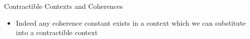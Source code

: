 \documentclass[12pt, mathserif,handout]{beamer}
\begin{document}
\begin{frame}[allowframebreaks,t]{Contractible Contexts and Coherences}
\begin{itemize}
\item Indeed
 any coherence constant exists in a context which we can
  substitute into a contractible context

\small{
\begin{code}\>\<%
\\
\>  \<%
\\
\>[0]\<[2]%
\>[2] \<[7]%
\>[7]\AgdaSymbol{:} \AgdaSymbol{\}\{} \AgdaSymbol{:}  \AgdaSymbol{\}}      \<%
\\
\>[0]\<[2]%
\>[2] \<[7]%
\>[7]\AgdaSymbol{:}  \AgdaSymbol{\}}     \AgdaSymbol{(} \AgdaSymbol{:}   \AgdaSymbol{)} \<[42]%
\>[42]\<%
\\
\>[2]\<[7]%
\>[7] \AgdaSymbol{(} \AgdaSymbol{:}  \AgdaSymbol{)}   \AgdaSymbol{(} \AgdaFunction{[}  \AgdaFunction{]T}\AgdaSymbol{)}\<%
\\
\>\<\end{code}
}

\end{itemize}

\end{frame}
\end{document}
